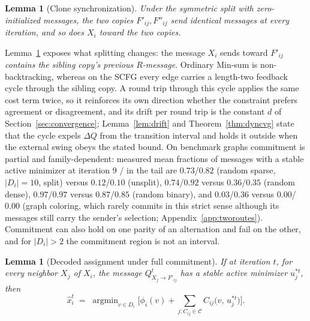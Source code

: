 \documentclass[letterpaper]{article} %
\newtheorem{lemma}[theorem]{Lemma}
\theoremstyle{definition}
\theoremstyle{remark}
\begin{document}
\begin{lemma}[Clone synchronization]\label{lem:clones}
Under the symmetric split with zero-initialized messages, the two copies
$F'_{ij}, F''_{ij}$ send identical messages at every iteration, and so
does $X_i$ toward the two copies.
\end{lemma}

Lemma~\ref{lem:clones} exposes what splitting changes: the message $X_i$
sends toward $F'_{ij}$ \emph{contains the sibling copy's previous
$R$-message}.  Ordinary Min-sum is non-backtracking, whereas on the SCFG
every edge carries a length-two feedback cycle through the sibling copy.
A round trip through this cycle applies the same cost term twice, so it
reinforces its own direction whether the constraint prefers agreement or
disagreement, and its drift per round trip is the constant $d$ of
Section~\ref{sec:convergence}; Lemma~\ref{lem:drift} and
Theorem~\ref{thm:dyncvg} state that the cycle expels $\Delta Q$ from the
transition interval and holds it outside when the external swing obeys
the stated bound.  On benchmark graphs commitment is partial and
family-dependent: measured mean fractions of messages with a stable
active minimizer at iteration $9$ / in the tail are $0.73$/$0.82$
(random sparse, $|D_i|{=}10$, split) versus $0.12$/$0.10$ (unsplit),
$0.74$/$0.92$ versus $0.36$/$0.35$ (random dense), $0.97$/$0.97$ versus
$0.87$/$0.85$ (random binary), and $0.03$/$0.36$ versus $0.00$/$0.00$
(graph coloring, which rarely commits in this strict sense although its
messages still carry the sender's selection; Appendix~\ref{app:tworoutes}).
Commitment can also hold on one parity of an alternation and fail on the
other, and for $|D_i| > 2$ the commitment region is not an interval.

\begin{lemma}[Decoded assignment under full commitment]\label{lem:decode}
If at iteration $t$, for every neighbor $X_j$ of $X_i$, the message
$Q^{t}_{X_j \to F'_{ij}}$ has a stable active minimizer $u^{*t}_j$, then
\[
  \hat{x}^{t}_i \;=\; \operatorname{argmin}_{v \in D_i}
  \Big[\phi_i(v) + \sum_{j : C_{ij}\in\mathcal{C}}
  C_{ij}\big(v,\, u^{*t}_j\big)\Big].
\]
\end{lemma}
\end{document}
